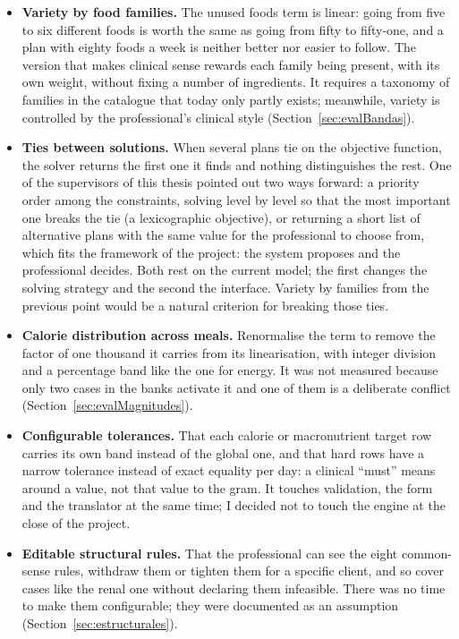 \begin{itemize}
    \item \textbf{Variety by food families.} The unused foods term is linear: going from five to six different foods is worth the same as going from fifty to fifty-one, and a plan with eighty foods a week is neither better nor easier to follow. The version that makes clinical sense rewards each family being present, with its own weight, without fixing a number of ingredients. It requires a taxonomy of families in the catalogue that today only partly exists; meanwhile, variety is controlled by the professional's clinical style (Section~\ref{sec:evalBandas}).
    \item \textbf{Ties between solutions.} When several plans tie on the objective function, the solver returns the first one it finds and nothing distinguishes the rest. One of the supervisors of this thesis pointed out two ways forward: a priority order among the constraints, solving level by level so that the most important one breaks the tie (a lexicographic objective), or returning a short list of alternative plans with the same value for the professional to choose from, which fits the framework of the project: the system proposes and the professional decides. Both rest on the current model; the first changes the solving strategy and the second the interface. Variety by families from the previous point would be a natural criterion for breaking those ties.
    \item \textbf{Calorie distribution across meals.} Renormalise the term to remove the factor of one thousand it carries from its linearisation, with integer division and a percentage band like the one for energy. It was not measured because only two cases in the banks activate it and one of them is a deliberate conflict (Section~\ref{sec:evalMagnitudes}).
    \item \textbf{Configurable tolerances.} That each calorie or macronutrient target row carries its own band instead of the global one, and that hard rows have a narrow tolerance instead of exact equality per day: a clinical ``must'' means around a value, not that value to the gram. It touches validation, the form and the translator at the same time; I decided not to touch the engine at the close of the project.
    \item \textbf{Editable structural rules.} That the professional can see the eight common-sense rules, withdraw them or tighten them for a specific client, and so cover cases like the renal one without declaring them infeasible. There was no time to make them configurable; they were documented as an assumption (Section~\ref{sec:estructurales}).

\end{itemize}
